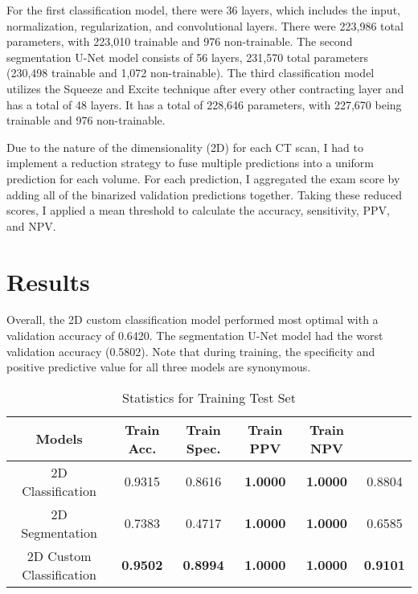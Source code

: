 \documentclass [12pt, letterpaper] {article}
\begin{document}
For the first classification model, there were 36 layers, which includes the input, normalization, regularization, and convolutional layers. There were 223,986 total parameters, with 223,010 trainable and 976 non-trainable. The second segmentation U-Net model consists of 56 layers, 231,570 total parameters (230,498 trainable and 1,072 non-trainable). The third classification model utilizes the Squeeze and Excite technique after every other contracting layer and has a total of 48 layers. It has a total of 228,646 parameters, with 227,670 being trainable and 976 non-trainable. 

Due to the nature of the dimensionality (2D) for each CT scan, I had to implement a reduction strategy to fuse multiple predictions into a uniform prediction for each volume. For each prediction, I aggregated the exam score by adding all of the binarized validation predictions together. Taking these reduced scores, I applied a mean threshold to calculate the accuracy, sensitivity, PPV, and NPV. 

\section{Results}
Overall, the 2D custom classification model performed most optimal with a validation accuracy of 0.6420. The segmentation U-Net model had the worst validation accuracy (0.5802). Note that during training, the specificity and positive predictive value for all three models are synonymous. 

\begin{table}[h!]
\centering
\small
\begin{tabular}{ c c c c c c } 
 \hline
 Models & Train Acc. & Train Spec. & Train PPV & Train NPV\\  [0.5ex] 
 \hline
 2D Classification & 0.9315 & 0.8616 & \textbf{1.0000} & \textbf{1.0000} & 0.8804 \\
 2D Segmentation  & 0.7383 & 0.4717 & \textbf{1.0000} & \textbf{1.0000} & 0.6585 \\
 2D Custom Classification & \textbf{0.9502} & \textbf{0.8994} & \textbf{1.0000} & \textbf{1.0000} & \textbf{0.9101}\\

 \hline
\end{tabular}

\caption{Statistics for Training Test Set}
\label{table:data}
\end{table}
\end{document}
